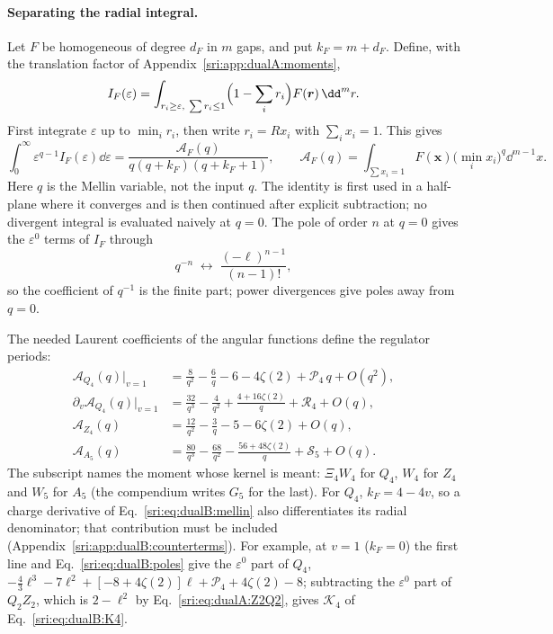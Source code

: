 \paragraph{Separating the radial integral.} Let $F$ be homogeneous of degree $d_F$ in $m$ gaps, and put $k_F=m+d_F$.
Define, with the translation factor of Appendix~\ref{sri:app:dualA:moments},
\begin{equation}
 I_F(\varepsilon)=\int_{r_i\ge\varepsilon,\ \sum r_i\le1}\Bigl(1-\sum_ir_i\Bigr)F(\boldsymbol r)\,\dd^mr.
\end{equation}
First integrate $\varepsilon$ up to $\min_ir_i$, then write $r_i=Rx_i$ with $\sum_ix_i=1$. This gives
\begin{equation}
 \int_0^\infty\varepsilon^{q-1}I_F(\varepsilon)\dd\varepsilon=\frac{\mathcal A_F(q)}{q(q+k_F)(q+k_F+1)},\qquad
 \mathcal A_F(q)=\int_{\sum x_i=1}F(\boldsymbol x)\bigl(\min_ix_i\bigr)^q\dd^{m-1}x.
 \label{sri:eq:dualB:mellin}
\end{equation}
Here $q$ is the Mellin variable, not the input $q$. The identity is first used in a half-plane where it converges and
is then continued after explicit subtraction; no divergent integral is evaluated naively at $q=0$. The pole of order
$n$ at $q=0$ gives the $\varepsilon^0$ terms of $I_F$ through
\begin{equation}
 q^{-n}\;\longleftrightarrow\;\frac{(-\ell)^{n-1}}{(n-1)!},
 \label{sri:eq:dualB:poles}
\end{equation}
so the coefficient of $q^{-1}$ is the finite part; power divergences give poles away from $q=0$.

The needed Laurent coefficients of the angular functions define the regulator periods:
\begin{equation}
\begin{aligned}
 \mathcal A_{Q_4}(q)\big|_{v=1}&=\frac8{q^2}-\frac6q-6-4\zeta(2)+\mathcal P_4\,q+O(q^2),\\
 \partial_v\mathcal A_{Q_4}(q)\big|_{v=1}&=\frac{32}{q^3}-\frac4{q^2}+\frac{4+16\zeta(2)}{q}+\mathcal R_4+O(q),\\
 \mathcal A_{Z_4}(q)&=\frac{12}{q^2}-\frac3q-5-6\zeta(2)+O(q),\\
 \mathcal A_{A_5}(q)&=\frac{80}{q^3}-\frac{68}{q^2}-\frac{56+48\zeta(2)}{q}+\mathcal S_5+O(q).
\end{aligned}
\label{sri:eq:dualB:laurent}
\end{equation}
The subscript names the moment whose kernel is meant: $\Xi_4W_4$ for $Q_4$, $W_4$ for $Z_4$ and $W_5$ for $A_5$ (the
compendium writes $G_5$ for the last). For $Q_4$, $k_F=4-4v$, so a charge derivative of Eq.~\eqref{sri:eq:dualB:mellin}
also differentiates its radial denominator; that contribution must be included
(Appendix~\ref{sri:app:dualB:counterterms}). For example, at $v=1$ ($k_F=0$) the first line and
Eq.~\eqref{sri:eq:dualB:poles} give the $\varepsilon^0$ part of $Q_4$,
$-\frac43\ell^3-7\ell^2+[-8+4\zeta(2)]\ell+\mathcal P_4+4\zeta(2)-8$; subtracting the $\varepsilon^0$ part of $Q_2Z_2$,
which is $2-\ell^2$ by Eq.~\eqref{sri:eq:dualA:Z2Q2}, gives $\mathcal K_4$ of Eq.~\eqref{sri:eq:dualB:K4}.

